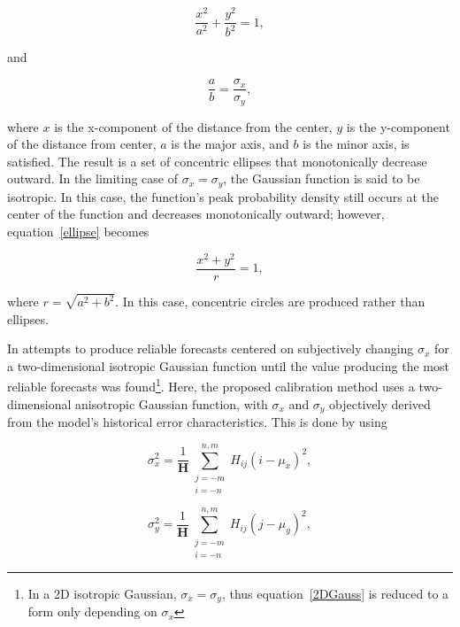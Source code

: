     \begin{equation}
        \label{ellipse}
        \frac{x^2}{a^2} + \frac{y^2}{b^2} = 1,
    \end{equation}

\noindent and

    \begin{equation}
        \frac{a}{b} = \frac{\sigma_x}{\sigma_y},
    \end{equation}

\noindent where $x$ is the x-component of the distance from the center, $y$ is the y-component of the distance from center, $a$ is the major axis, and $b$ is the minor axis, is satisfied.
The result is a set of concentric ellipses that monotonically decrease outward.
In the limiting case of $\sigma_x = \sigma_y$, the Gaussian function is said to be isotropic.
In this case, the function's peak probability density still occurs at the center of the function and decreases monotonically outward; however, \mbox{equation \ref{ellipse}} becomes

    \begin{equation}
        \frac{x^2 + y^2}{r} = 1,
    \end{equation}

\noindent where $r = \sqrt{a^2 + b^2}$.
In this case, concentric circles are produced rather than ellipses.

In \cite{Sobash2011} attempts to produce reliable forecasts centered on subjectively changing $\sigma_x$ for a two-dimensional isotropic Gaussian function until the value producing the most reliable forecasts was found\footnote{In a 2D isotropic Gaussian, $\sigma_x = \sigma_y$, thus \mbox{equation \ref{2DGauss}} is reduced to a form only depending on $\sigma_x$}.
Here, the proposed calibration method uses a two-dimensional anisotropic Gaussian function, with $\sigma_x$ and $\sigma_y$ objectively derived from the model's historical error characteristics.
This is done by using

    \begin{equation}
        \label{sigmax}
        \sigma_x^2 = \frac{1}{\mathbf{H}} \sum\limits_{\substack{j=-m \\ i=-n}}^{n,m}H_{ij}(i - \mu_x)^2,
    \end{equation}

    \begin{equation}
        \label{sigmay}
        \sigma_y^2 = \frac{1}{\mathbf{H}} \sum\limits_{\substack{j=-m \\ i=-n}}^{n,m}H_{ij}(j - \mu_y)^2,
    \end{equation}

